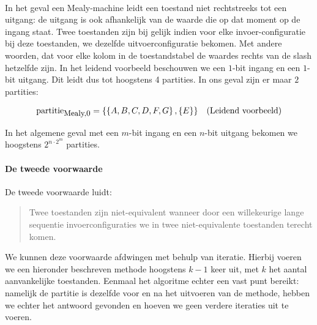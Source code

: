 \paragraph{}
In het geval een Mealy-machine leidt een toestand niet rechtstreeks tot een uitgang: de uitgang is ook afhankelijk van de waarde die op dat moment op de ingang staat. Twee toestanden zijn bij gelijk indien voor elke invoer-configuratie bij deze toestanden, we dezelfde uitvoerconfiguratie bekomen. Met andere woorden, dat voor elke kolom in de toestandstabel de waardes rechts van de slash hetzelfde zijn. In het leidend voorbeeld beschouwen we een $1$-bit ingang en een $1$-bit uitgang. Dit leidt dus tot hoogstens 4 partities. In ons geval zijn er maar $2$ partities:

\begin{equation}
\begin{array}{lr}
\mbox{partitie}_{\mbox{\small{Mealy,0}}}=\left\{ \left\{ A,B,C,D,F,G \right\},\left\{ E \right\} \right\}&\mbox{(Leidend voorbeeld)}
\end{array}
\end{equation}

In het algemene geval met een $m$-bit ingang en een $n$-bit uitgang bekomen we hoogstens $2^{n\cdot 2^m}$ partities.

\paragraph{De tweede voorwaarde}
De tweede voorwaarde luidt:

\begin{quote}
Twee toestanden zijn niet-equivalent wanneer door een willekeurige lange sequentie invoerconfiguraties we in twee niet-equivalente toestanden terecht komen.
\end{quote}

We kunnen deze voorwaarde afdwingen met behulp van iteratie. Hierbij voeren we een hieronder beschreven methode hoogstens $k-1$ keer uit, met $k$ het aantal aanvankelijke toestanden. Eenmaal het algoritme echter een vast punt bereikt: namelijk de partitie is dezelfde voor en na het uitvoeren van de methode, hebben we echter het antwoord gevonden en hoeven we geen verdere iteraties uit te voeren.

